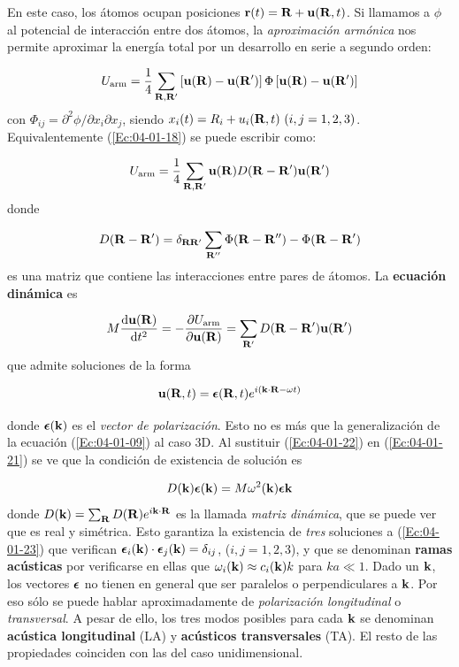 En este caso, los átomos ocupan posiciones $\mathbf{r}(t) = \mathbf{R} + \mathbf{u} (\mathbf{R},t)$. Si llamamos a $\phi$ al potencial de interacción entre dos átomos, la \textit{aproximación armónica} nos permite aproximar la energía total por un desarrollo en serie a segundo orden:

\begin{equation}
	U_{\text{arm}} = \frac{1}{4} \sum_{\mathbf{R},\mathbf{R}'} \left[ \mathbf{u}(\mathbf{R})-\mathbf{u}(\mathbf{R}') \right] \Phi \left[ \mathbf{u}(\mathbf{R})-\mathbf{u}(\mathbf{R}') \right] \label{Ec:04-01-18}
\end{equation}
con $\Phi_{ij}=\partial^2 \phi / \partial x_i \partial x_j$, siendo $x_i(t) = R_i + u_i (\Rn,t) \ (i,j=1,2,3)$. Equivalentemente (\ref{Ec:04-01-18}) se puede escribir como:

\begin{equation}
	U_{\text{arm}} = \frac{1}{4} \sum_{\mathbf{R},\mathbf{R}'}\mathbf{u}(\mathbf{R}) D(\mathbf{R}-\mathbf{R}' ) \mathbf{u}(\mathbf{R}') \label{Ec:04-01-13}
\end{equation}
donde 

\begin{equation}
	 D(\mathbf{R}-\mathbf{R}' ) = \delta_{\mathbf{R} \mathbf{R}'} \sum_{\mathbf{R}''} \Phi (\mathbf{R}- \mathbf{R}'') - \Phi (\mathbf{R} - \mathbf{R}')
\end{equation}
es una matriz que contiene las interacciones entre pares de átomos. La {\bf ecuación dinámica} es

\begin{equation}
 	M \frac{\mathrm{d} \mathbf{u} (\mathbf{R})}{\mathrm{d} t^2} =  - \frac{\partial U_\text{arm}}{\partial \mathbf{u} (\mathbf{R})} = \sum_{\mathbf{R}'} D (\mathbf{R}-\mathbf{R}') \mathbf{u} (\mathbf{R}') \label{Ec:04-01-21}
\end{equation}
que admite soluciones de la forma

\begin{mybox}
\begin{equation}
	\mathbf{u} (\mathbf{R},t) = \boldsymbol{\epsilon} (\mathbf{R},t) e^{i(\mathbf{k} \cdot \mathbf{R} - \omega t)}  \label{Ec:04-01-22}
\end{equation}
\end{mybox}
donde $\boldsymbol{\epsilon}(\mathbf{k})$ es el \textit{vector de polarización}. Esto no es más que la generalización de la ecuación (\ref{Ec:04-01-09}) al caso 3D. Al sustituir  (\ref{Ec:04-01-22}) en (\ref{Ec:04-01-21}) se ve que la condición de existencia de solución es 

\begin{equation}
	D(\mathbf{k}) \boldsymbol{\epsilon} (\mathbf{k}) = M \omega^2 (\mathbf{k}) \boldsymbol{\epsilon} \mathbf{k} \label{Ec:04-01-23}
\end{equation}
donde $D(\mathbf{k}) = \sum_{\mathbf{R}} D(\mathbf{R}) e^{i \mathbf{k} \cdot \mathbf{R}}$ es la llamada \textit{matriz dinámica}, que se puede ver que es real y simétrica. Esto garantiza la existencia de \textit{tres} soluciones a (\ref{Ec:04-01-23}) que verifican $\boldsymbol{\epsilon}_i (\mathbf{k}) \cdot \boldsymbol{\epsilon}_j (\mathbf{k}) = \delta_{ij}$, ($i,j=1,2,3$), y que se denominan \textbf{ramas acústicas} por verificarse en ellas que $\omega_i (\mathbf{k}) \approx c_i (\mathbf{k})k$ para $ka\ll 1$. Dado un $\mathbf{k}$, los vectores $\boldsymbol{\epsilon}$ no tienen en general que ser paralelos o perpendiculares a $\mathbf{k}$. Por eso sólo se puede hablar aproximadamente de \textit{polarización longitudinal} o \textit{transversal}. A pesar de ello, los tres modos posibles para cada $\mathbf{k}$ se denominan \textbf{acústica longitudinal} (LA) y \textbf{acústicos transversales} (TA). El resto de las propiedades coinciden con las del caso unidimensional.

